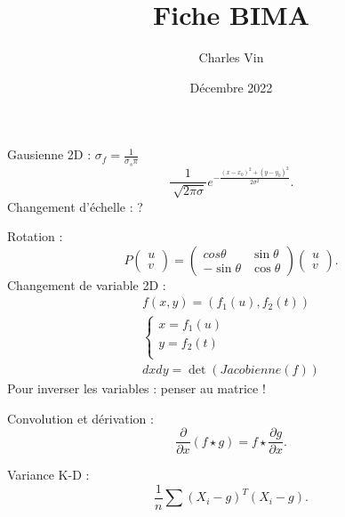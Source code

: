 \documentclass{article}
\title{Fiche BIMA}
\author{Charles Vin}
\date{Décembre 2022}
\theoremstyle{plain}%
\theoremstyle{definition}
\theoremstyle{remark}
\begin{document}
\maketitle
\tableofcontents

Gausienne 2D : $ \sigma _f = \frac{1}{\sigma _s \pi } $ 
\[
    \frac{1}{\sqrt[]{2 \pi \sigma }} e^{- \frac{(x-x_0)^2 + (y-y_0)^2}{2 \sigma ^2}}
.\]
Changement d'échelle : ?

Rotation : 
\[
    P \begin{pmatrix}
        u \\
        v
    \end{pmatrix} = \begin{pmatrix}
        cos \theta & \sin \theta \\
        - \sin \theta & \cos \theta 
    \end{pmatrix} \begin{pmatrix}
        u \\
        v
    \end{pmatrix}
.\]
Changement de variable 2D : \begin{align*}
    f(x,y) = (f_1(u), f_2(t)) \\
    \begin{cases}
    x = f_1(u)\\
    y = f_2(t)\\
    \end{cases} \\
    dxdy = \det (Jacobienne(f))
\end{align*}
Pour inverser les variables : penser au matrice ! 

Convolution et dérivation : 
\[
    \frac{\partial }{\partial x}(f \star g) = f \star \frac{\partial g}{\partial x}
.\]

Variance K-D : 
\[
    \frac{1}{n} \sum_{}^{}(X_i - g)^T (X_i - g)
.\]
\end{document}
